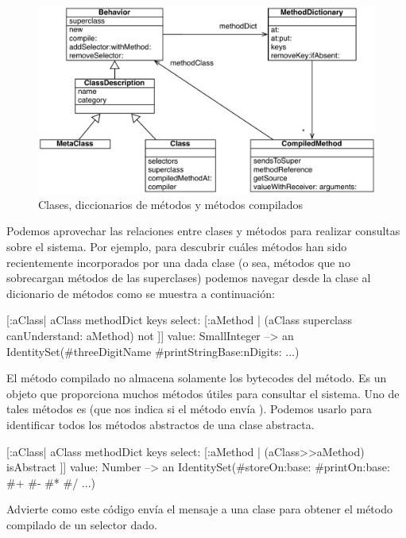 \documentclass[a4paper,10pt,twoside]{book}
\begin{document}
\begin{figure}[ht]\centering
        \includegraphics[width=\linewidth]{MethodsAsObjects}
        \caption{Clases, diccionarios de métodos y métodos compilados}
\end{figure}

Podemos aprovechar las relaciones entre clases y métodos para realizar
consultas sobre el sistema.  Por ejemplo, para descubrir cuáles
métodos han sido recientemente incorporados por una dada clase (o sea,
métodos que no sobrecargan métodos de las superclases) podemos navegar
desde la clase al dicionario de métodos como se muestra a
continuación:
\begin{code}{}
[:aClass| aClass methodDict keys select: [:aMethod |
  (aClass superclass canUnderstand: aMethod) not ]] value: SmallInteger
  --> an IdentitySet(#threeDigitName #printStringBase:nDigits: ...)
\end{code}

El método compilado no almacena solamente los bytecodes del método.
Es un objeto que proporciona muchos métodos útiles para consultar el
sistema.  Uno de tales métodos es  (que nos indica si
el método envía ).  Podemos usarlo para
identificar todos los métodos abstractos de una clase abstracta.
\begin{code}{}
[:aClass| aClass methodDict keys select: [:aMethod |
  (aClass>>aMethod) isAbstract ]] value: Number
  --> an IdentitySet(#storeOn:base: #printOn:base: #+ #- #* #/ ...)
\end{code}
Advierte como este código envía el mensaje \ct{>>} a una clase para
obtener el método compilado de un selector dado.

\end{document}
